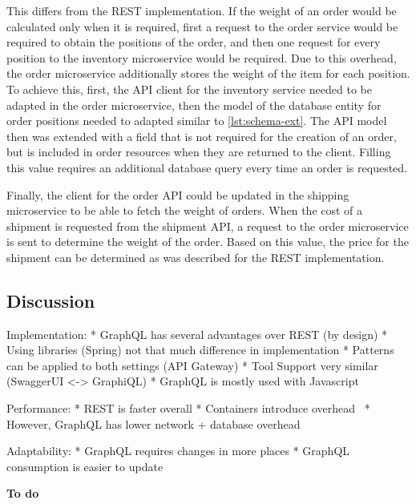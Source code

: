 This differs from the \ac{REST} implementation.
If the weight of an order would be calculated only when it is required, first a request to the order service would be required to obtain the positions of the order, and then one request for every position to the inventory microservice would be required.
Due to this overhead, the order microservice additionally stores the weight of the item for each position.
To achieve this, first, the \ac{API} client for the inventory service needed to be adapted in the order microservice, then the model of the database entity for order positions needed to adapted similar to \autoref{lst:schema-ext}.
The \ac{API} model then was extended with a field that is not required for the creation of an order, but is included in order resources when they are returned to the client.
Filling this value requires an additional database query every time an order is requested.

Finally, the client for the order \ac{API} could be updated in the shipping microservice to be able to fetch the weight of orders.
When the cost of a shipment is requested from the shipment \ac{API}, a request to the order microservice is sent to determine the weight of the order.
Based on this value, the price for the shipment can be determined as was described for the \ac{REST} implementation.

\subsection{Discussion}

Implementation:
* GraphQL has several advantages over REST (by design)
* Using libraries (Spring) not that much difference in implementation
* Patterns can be applied to both settings (API Gateway)
* Tool Support very similar (SwaggerUI <-> GraphiQL)
* GraphQL is mostly used with Javascript

Performance: 
* REST is faster overall
* Containers introduce overhead~\cite{Kratzke2017}
* However, GraphQL has lower network + database overhead

Adaptability:
* GraphQL requires changes in more places
* GraphQL consumption is easier to update

\textbf{To do}